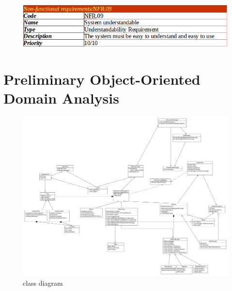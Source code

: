 \documentclass[]{article}
\begin{document}
\begin{figure}[H]
\centering
\includegraphics[scale=0.4]{./nonf/11}
\end{figure}

\section{Preliminary Object-Oriented Domain Analysis}

\begin{figure}[H]
\centering
\includegraphics[scale=0.22]{./classdiagram}
\caption{class diagram}
\end{figure}
\end{document}
